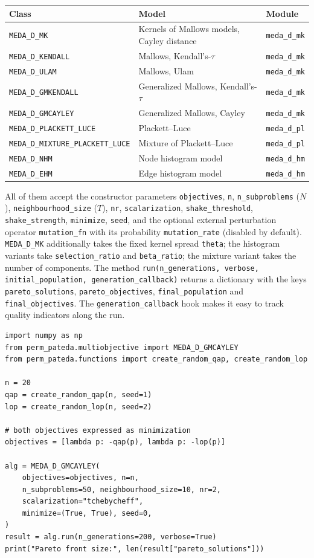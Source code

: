 \documentclass[a4paper,11pt]{article}
\begin{document}
\begin{center}
\begin{tabular}{lll}
\toprule
\textbf{Class} & \textbf{Model} & \textbf{Module} \\
\midrule
\texttt{MEDA\_D\_MK} & Kernels of Mallows models, Cayley distance & \texttt{meda\_d\_mk} \\
\texttt{MEDA\_D\_KENDALL} & Mallows, Kendall's-$\tau$ & \texttt{meda\_d\_mk} \\
\texttt{MEDA\_D\_ULAM} & Mallows, Ulam & \texttt{meda\_d\_mk} \\
\texttt{MEDA\_D\_GMKENDALL} & Generalized Mallows, Kendall's-$\tau$ & \texttt{meda\_d\_mk} \\
\texttt{MEDA\_D\_GMCAYLEY} & Generalized Mallows, Cayley & \texttt{meda\_d\_mk} \\
\texttt{MEDA\_D\_PLACKETT\_LUCE} & Plackett--Luce & \texttt{meda\_d\_pl} \\
\texttt{MEDA\_D\_MIXTURE\_PLACKETT\_LUCE} & Mixture of Plackett--Luce & \texttt{meda\_d\_pl} \\
\texttt{MEDA\_D\_NHM} & Node histogram model & \texttt{meda\_d\_hm} \\
\texttt{MEDA\_D\_EHM} & Edge histogram model & \texttt{meda\_d\_hm} \\
\bottomrule
\end{tabular}
\end{center}

All of them accept the constructor parameters \texttt{objectives}, \texttt{n},
\texttt{n\_subproblems} ($N$), \texttt{neighbourhood\_size} ($T$), \texttt{nr},
\texttt{scalarization}, \texttt{shake\_threshold}, \texttt{shake\_strength},
\texttt{minimize}, \texttt{seed}, and the optional external perturbation
operator \texttt{mutation\_fn} with its probability \texttt{mutation\_rate}
(disabled by default).  \texttt{MEDA\_D\_MK} additionally takes the fixed kernel
spread \texttt{theta}; the histogram variants take \texttt{selection\_ratio} and
\texttt{beta\_ratio}; the mixture variant takes the number of components.  The
method
\texttt{run(n\_generations, verbose, initial\_population, generation\_callback)}
returns a dictionary with the keys \texttt{pareto\_solutions},
\texttt{pareto\_objectives}, \texttt{final\_population} and
\texttt{final\_objectives}.  The \texttt{generation\_callback} hook makes it easy
to track quality indicators along the run.

\begin{lstlisting}
import numpy as np
from perm_pateda.multiobjective import MEDA_D_GMCAYLEY
from perm_pateda.functions import create_random_qap, create_random_lop

n = 20
qap = create_random_qap(n, seed=1)
lop = create_random_lop(n, seed=2)

# both objectives expressed as minimization
objectives = [lambda p: -qap(p), lambda p: -lop(p)]

alg = MEDA_D_GMCAYLEY(
    objectives=objectives, n=n,
    n_subproblems=50, neighbourhood_size=10, nr=2,
    scalarization="tchebycheff",
    minimize=(True, True), seed=0,
)
result = alg.run(n_generations=200, verbose=True)
print("Pareto front size:", len(result["pareto_solutions"]))
\end{lstlisting}
\end{document}
